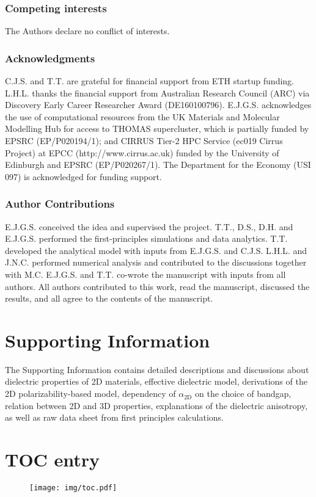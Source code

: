 \documentclass[journal=ancac3,manuscript=article,email=true,hyperref=true,keywords=false]{achemso}
\begin{document}
\subsubsection*{Competing interests}
The Authors declare no conflict of interests.


\subsubsection*{Acknowledgments}
C.J.S. and T.T. are grateful for financial support from ETH startup funding. 
L.H.L. thanks the financial support from Australian Research Council (ARC) 
via Discovery Early Career Researcher Award (DE160100796). 
E.J.G.S. acknowledges the use of computational resources from the UK 
Materials and Molecular Modelling Hub for access to THOMAS 
supercluster, which is partially funded by EPSRC (EP/P020194/1); and CIRRUS Tier-2 HPC 
Service (ec019 Cirrus Project) at EPCC (http://www.cirrus.ac.uk) funded 
by the University of Edinburgh and EPSRC (EP/P020267/1). 
The Department for the Economy (USI 097) is acknowledged for funding support.  


\subsubsection*{Author Contributions}
E.J.G.S. conceived the idea and supervised the project. 
T.T., D.S., D.H. and E.J.G.S. performed the first-principles simulations 
and data analytics. T.T. developed the analytical model with 
inputs from E.J.G.S. and C.J.S. L.H.L. and J.N.C. 
performed numerical analysis and contributed to the discussions together with M.C.
E.J.G.S. and T.T. co-wrote the manuscript with inputs from all authors. 
All authors contributed to this work, read the manuscript, discussed 
the results, and all agree to the contents of the manuscript. 


\section*{Supporting Information}

The Supporting Information contains detailed descriptions and
discussions about dielectric properties of 2D materials, effective
dielectric model, derivations of the 2D polarizability-based model,
dependency of $\alpha_{\mathrm{2D}}$ on the choice of bandgap,
relation between 2D and 3D properties, explanations of the dielectric
anisotropy, as well as raw data sheet from first principles
calculations. 





\label{sec:org34cbe74}
\clearpage

\section*{TOC entry}
\begin{figure}
  \centering
  \texttt{[image: img/toc.pdf]}  %
\end{figure}
\end{document}
